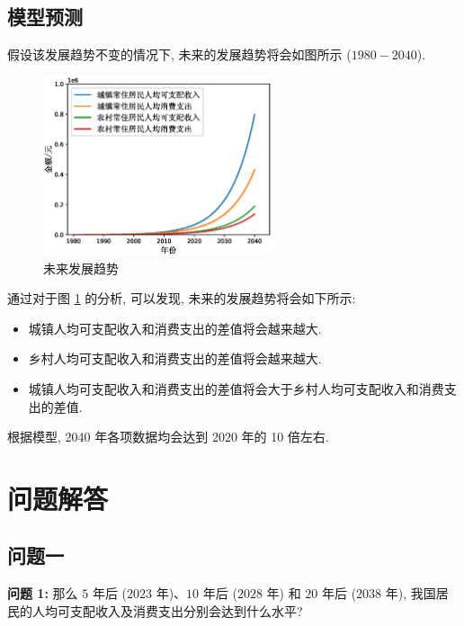 \documentclass{article}
\begin{document}
\subsection{模型预测}

\par 假设该发展趋势不变的情况下, 未来的发展趋势将会如图所示 ($1980-2040$).

\begin{figure}[H]
  \centering
  \includegraphics[width=0.6\textwidth]{figures/result1.eps}
  \caption{未来发展趋势}
  \label{fig:side:d}
\end{figure}

\par 通过对于图 \ref{fig:side:d} 的分析, 可以发现, 未来的发展趋势将会如下所示:
\begin{itemize}
  \item 城镇人均可支配收入和消费支出的差值将会越来越大.
  \item 乡村人均可支配收入和消费支出的差值将会越来越大.
  \item 城镇人均可支配收入和消费支出的差值将会大于乡村人均可支配收入和消费支出的差值.
\end{itemize}

\par 根据模型, 2040 年各项数据均会达到 2020 年的 10 倍左右.\\

\section{问题解答}

\subsection{问题一}

\begin{mdframed}
\fangsong
\textbf{问题 1:} 那么 $5$ 年后 ($2023$ 年)、$10$ 年后 ($2028$ 年) 和 $20$ 年后 ($2038$ 年), 我国居民的人均可支配收入及消费支出分别会达到什么水平?
\end{mdframed}
\end{document}
